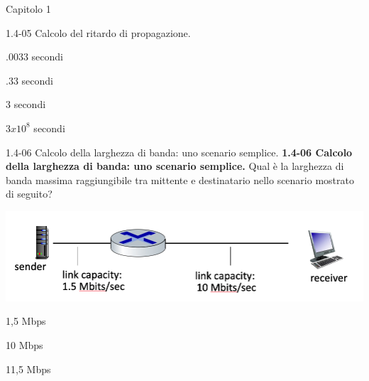 \documentclass[a4paper]{article}
\begin{document}
\begin{quiz}{Capitolo 1}
\begin{multi}[points=1]{1.4-05 Calcolo del ritardo di propagazione.}
\item* .0033 secondi
\item .33 secondi
\item 3 secondi
\item $3 x 10^8$ secondi
\end{multi}

\begin{multi}[points=1]{1.4-06 Calcolo della larghezza di banda: uno scenario semplice.}
\textbf{1.4-06 Calcolo della larghezza di banda: uno scenario semplice.} 
Qual è la larghezza di banda massima raggiungibile tra mittente e destinatario nello scenario mostrato di seguito? 
\begin{center}
\includegraphics[width=\linewidth]{figs/1.4.6.jpg}
\end{center}
%  
\item* 1,5 Mbps
\item 10 Mbps
\item 11,5 Mbps
\end{multi}


\end{quiz}
\end{document}
